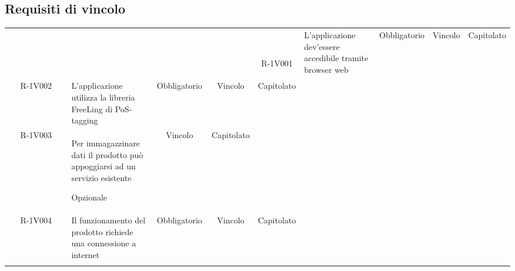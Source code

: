 \subsection{Requisiti di vincolo} 
\begin{tabularx}{\textwidth}{cXccc}
	
	\rowcolor{greySWEight}
	\textcolor{white}{\textbf{Identificativo}} &
	\textcolor{white}{\textbf{Descrizione}}&
	\textcolor{white}{\textbf{Importanza}}&
	\textcolor{white}{\textbf{Tipo}}&
	\textcolor{white}{\textbf{Fonte}}\endhead
	
	R-1V001 &
	
	L’applicazione dev'essere accedibile tramite browser web &
	
	Obbligatorio &
	
	Vincolo &
	
	Capitolato \\
	R-1V002 &
	
	L’applicazione utilizza la libreria FreeLing di PoS-tagging &
	
	Obbligatorio &
	
	Vincolo &
	
	Capitolato \\
	R-1V003 &
	
	Per immagazzinare dati il prodotto può appoggiarsi ad
un servizio esistente
	
	Opzionale &
	
	Vincolo &
	
	Capitolato \\
	R-1V004 &
	
	Il funzionamento del prodotto richiede una connessione a internet &
	
	Obbligatorio &
	
	Vincolo &
	
	Capitolato \\
	
	\caption{Tabella requisiti di vincolo} \label{tab:tabellarequisitivincolo}
\end{tabularx}

